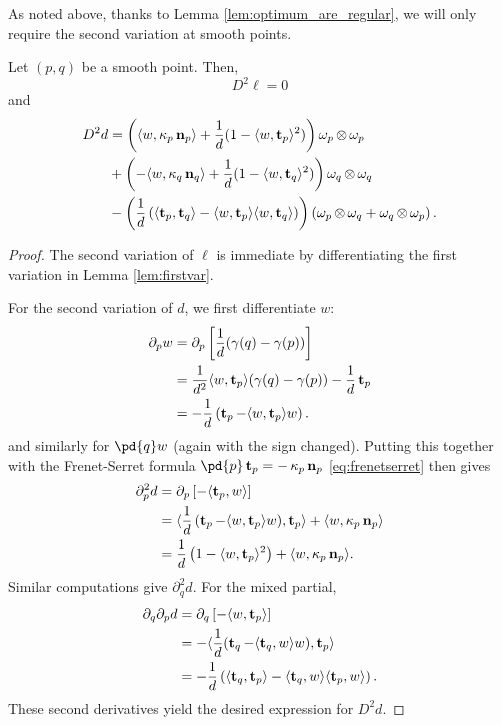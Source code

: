 \documentclass[12pt]{amsart}
\begin{document}
As noted above, thanks to Lemma \ref{lem:optimum_are_regular}, we will only require the second variation at smooth points.

\begin{lemma}
\label{lem:secondvar}
Let \((p,q)\) be a smooth point. Then,
\[
D^2 \ell = 0
\]
and
\[
\begin{split}
D^2d &= \left(\langle{w},{\operatorname{\kappa}_p \operatorname{\mathbf{n}}_p}\rangle + \frac{1}{d}(1 - \langle{w},{\operatorname{\mathbf{t}}_p}\rangle^2) \right) \omega_p \operatorname{\otimes} \omega_p \\
&+ \left(-\langle{w},{\operatorname{\kappa}_q \operatorname{\mathbf{n}}_q}\rangle + \frac{1}{d}(1 - \langle{w},{\operatorname{\mathbf{t}}_q}\rangle^2) \right) \omega_q \operatorname{\otimes} \omega_q \\
&- \left(\frac{1}{d}\left(\langle{\operatorname{\mathbf{t}}_p},{\operatorname{\mathbf{t}}_q}\rangle - \langle{w},{\operatorname{\mathbf{t}}_p}\rangle\langle{w},{\operatorname{\mathbf{t}}_q}\rangle\right) \right) \left(\omega_p \operatorname{\otimes} \omega_q + \omega_q \operatorname{\otimes} \omega_p\right).
\end{split}
\]
\end{lemma}

\begin{proof}
The second variation of \(\ell\) is immediate by differentiating the first variation in Lemma \ref{lem:firstvar}.

For the second variation of \(d\), we first differentiate $w$:
\[
\begin{split}
\partial_p w &= \partial_p \left[\frac{1}{d} (\gamma(q) - \gamma(p))\right] \\
&= \frac{1}{d^2} \langle{w},{\operatorname{\mathbf{t}}_p}\rangle (\gamma(q) - \gamma(p)) - \frac{1}{d} \operatorname{\mathbf{t}}_p \\
&= -\frac{1}{d}\left(\operatorname{\mathbf{t}}_p - \langle{w},{\operatorname{\mathbf{t}}_p}\rangle w\right).
\end{split}
\]
and similarly for $\pd{q} w$ (again with the sign changed).  Putting this together with the Frenet-Serret formula $\pd{p} \tang_p = -\curvecurv_p \nor_p$ \eqref{eq:frenetserret} then gives
\[
\begin{split}
\partial_p^2 d &= \partial_p \left[-\langle{\operatorname{\mathbf{t}}_p},{w}\rangle\right] \\
&= \langle{\frac{1}{d}\left(\operatorname{\mathbf{t}}_p - \ensuremath{\langle{w},{\operatorname{\mathbf{t}}_p}\rangle} w\right)},{\operatorname{\mathbf{t}}_p}\rangle + \langle{w},{\operatorname{\kappa}_p \operatorname{\mathbf{n}}_p}\rangle \\
&= \frac{1}{d}\left(1 - \langle{w},{\operatorname{\mathbf{t}}_p}\rangle^2\right) + \langle{w},{\operatorname{\kappa}_p \operatorname{\mathbf{n}}_p}\rangle.
\end{split}
\]
Similar computations give $\partial_q^2 d$. For the mixed partial,
\[
\begin{split}
\partial_q \partial_p d &= \partial_q \left[-\langle{w},{\operatorname{\mathbf{t}}_p}\rangle\right] \\
&= -\langle{\frac{1}{d}(\operatorname{\mathbf{t}}_q - \ensuremath{\langle{\operatorname{\mathbf{t}}_q},{w}\rangle}w)},{\operatorname{\mathbf{t}}_p}\rangle \\
&= - \frac{1}{d} \left(\langle{\operatorname{\mathbf{t}}_q},{\operatorname{\mathbf{t}}_p}\rangle - \langle{\operatorname{\mathbf{t}}_q},{w}\rangle\langle{\operatorname{\mathbf{t}}_p},{w}\rangle\right).
\end{split}
\]
These second derivatives yield the desired expression for \(D^2 d\).
\end{proof}
\end{document}
